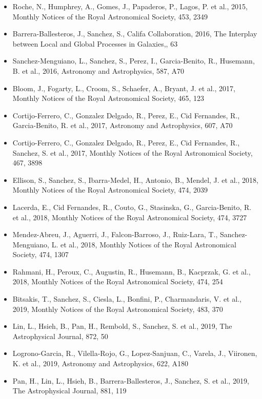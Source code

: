 \documentclass{letter}
\begin{document}
\begin{enumerate}
\begin{itemize}
\item Roche, N., Humphrey, A., Gomes, J., Papaderos, P., Lagos, P. et al., 2015, Monthly Notices of the Royal Astronomical Society, 453, 2349
\item Barrera-Ballesteros, J., Sanchez, S., Califa Collaboration, 2016, The Interplay between Local and Global Processes in Galaxies,, 63
\item Sanchez-Menguiano, L., Sanchez, S., Perez, I., Garcia-Benito, R., Husemann, B. et al., 2016, Astronomy and Astrophysics, 587, A70
\item Bloom, J., Fogarty, L., Croom, S., Schaefer, A., Bryant, J. et al., 2017, Monthly Notices of the Royal Astronomical Society, 465, 123
\item Cortijo-Ferrero, C., Gonzalez Delgado, R., Perez, E., Cid Fernandes, R., Garcia-Benito, R. et al., 2017, Astronomy and Astrophysics, 607, A70
\item Cortijo-Ferrero, C., Gonzalez Delgado, R., Perez, E., Cid Fernandes, R., Sanchez, S. et al., 2017, Monthly Notices of the Royal Astronomical Society, 467, 3898
\item Ellison, S., Sanchez, S., Ibarra-Medel, H., Antonio, B., Mendel, J. et al., 2018, Monthly Notices of the Royal Astronomical Society, 474, 2039
\item Lacerda, E., Cid Fernandes, R., Couto, G., Stasinska, G., Garcia-Benito, R. et al., 2018, Monthly Notices of the Royal Astronomical Society, 474, 3727
\item Mendez-Abreu, J., Aguerri, J., Falcon-Barroso, J., Ruiz-Lara, T., Sanchez-Menguiano, L. et al., 2018, Monthly Notices of the Royal Astronomical Society, 474, 1307
\item Rahmani, H., Peroux, C., Augustin, R., Husemann, B., Kacprzak, G. et al., 2018, Monthly Notices of the Royal Astronomical Society, 474, 254
\item Bitsakis, T., Sanchez, S., Ciesla, L., Bonfini, P., Charmandaris, V. et al., 2019, Monthly Notices of the Royal Astronomical Society, 483, 370
\item Lin, L., Hsieh, B., Pan, H., Rembold, S., Sanchez, S. et al., 2019, The Astrophysical Journal, 872, 50
\item Logrono-Garcia, R., Vilella-Rojo, G., Lopez-Sanjuan, C., Varela, J., Viironen, K. et al., 2019, Astronomy and Astrophysics, 622, A180
\item Pan, H., Lin, L., Hsieh, B., Barrera-Ballesteros, J., Sanchez, S. et al., 2019, The Astrophysical Journal, 881, 119

\end{itemize}
\end{enumerate}
\end{document}
